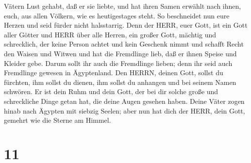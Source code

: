 Vätern Lust gehabt, daß er sie liebte, und hat ihren Samen erwählt nach
ihnen, euch, aus allen Völkern, wie es heutigestages steht.
 So beschneidet nun eure Herzen und seid fürder nicht
halsstarrig.  Denn der HERR, euer Gott, ist ein Gott aller
Götter und HERR über alle Herren, ein großer Gott, mächtig und
schrecklich, der keine Person achtet und kein Geschenk nimmt
 und schafft Recht den Waisen und Witwen und hat die
Fremdlinge lieb, daß er ihnen Speise und Kleider gebe. 
Darum sollt ihr auch die Fremdlinge lieben; denn ihr seid auch
Fremdlinge gewesen in Ägyptenland.  Den HERRN, deinen Gott,
sollst du fürchten, ihm sollst du dienen, ihm sollst du anhangen und bei
seinem Namen schwören.  Er ist dein Ruhm und dein Gott, der
bei dir solche große und schreckliche Dinge getan hat, die deine Augen
gesehen haben.  Deine Väter zogen hinab nach Ägypten mit
siebzig Seelen; aber nun hat dich der HERR, dein Gott, gemehrt wie die
Sterne am Himmel.

\hypertarget{section-10}{%
\section{11}\label{section-10}}

